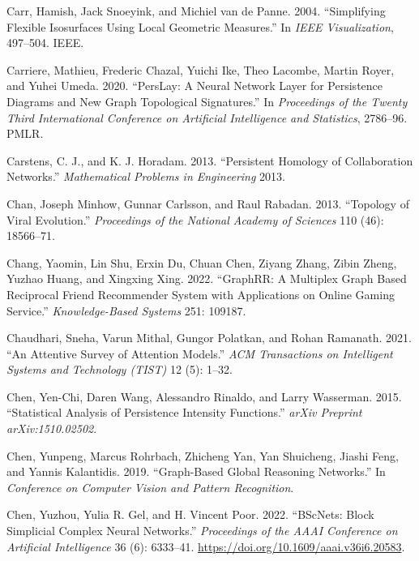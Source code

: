 \documentclass[
  12pt,
]{krantz}
\newlength{\cslhangindent}
\newenvironment{CSLReferences}[2] %
 {\begin{list}{}{%
  \setlength{\itemindent}{0pt}
  \setlength{\leftmargin}{0pt}
  \setlength{\parsep}{0pt}
  \ifodd #1
   \setlength{\leftmargin}{\cslhangindent}
   \setlength{\itemindent}{-1\cslhangindent}
  \fi
  \setlength{\itemsep}{#2\baselineskip}}}
 {\end{list}}
\begin{document}
\begin{CSLReferences}{1}{0}
Carr, Hamish, Jack Snoeyink, and Michiel van de Panne. 2004.
{``Simplifying Flexible Isosurfaces Using Local Geometric Measures.''}
In \emph{{IEEE} Visualization}, 497--504. IEEE.

Carriere, Mathieu, Frederic Chazal, Yuichi Ike, Theo Lacombe, Martin
Royer, and Yuhei Umeda. 2020. {``{PersLay}: A Neural Network Layer for
Persistence Diagrams and New Graph Topological Signatures.''} In
\emph{Proceedings of the {Twenty} {Third} {International} {Conference}
on {Artificial} {Intelligence} and {Statistics}}, 2786--96. PMLR.

Carstens, C. J., and K. J. Horadam. 2013. {``Persistent Homology of
Collaboration Networks.''} \emph{Mathematical Problems in Engineering}
2013.

Chan, Joseph Minhow, Gunnar Carlsson, and Raul Rabadan. 2013.
{``Topology of Viral Evolution.''} \emph{Proceedings of the National
Academy of Sciences} 110 (46): 18566--71.

Chang, Yaomin, Lin Shu, Erxin Du, Chuan Chen, Ziyang Zhang, Zibin Zheng,
Yuzhao Huang, and Xingxing Xing. 2022. {``Graph{RR}: A Multiplex Graph
Based Reciprocal Friend Recommender System with Applications on Online
Gaming Service.''} \emph{Knowledge-Based Systems} 251: 109187.

Chaudhari, Sneha, Varun Mithal, Gungor Polatkan, and Rohan Ramanath.
2021. {``An Attentive Survey of Attention Models.''} \emph{ACM
Transactions on Intelligent Systems and Technology (TIST)} 12 (5):
1--32.

Chen, Yen-Chi, Daren Wang, Alessandro Rinaldo, and Larry Wasserman.
2015. {``Statistical Analysis of Persistence Intensity Functions.''}
\emph{arXiv Preprint arXiv:1510.02502}.

Chen, Yunpeng, Marcus Rohrbach, Zhicheng Yan, Yan Shuicheng, Jiashi
Feng, and Yannis Kalantidis. 2019. {``Graph-Based Global Reasoning
Networks.''} In \emph{Conference on Computer Vision and Pattern
Recognition}.

Chen, Yuzhou, Yulia R. Gel, and H. Vincent Poor. 2022. {``{BS}c{N}ets:
Block Simplicial Complex Neural Networks.''} \emph{Proceedings of the
AAAI Conference on Artificial Intelligence} 36 (6): 6333--41.
\url{https://doi.org/10.1609/aaai.v36i6.20583}.


\end{CSLReferences}
\end{document}
